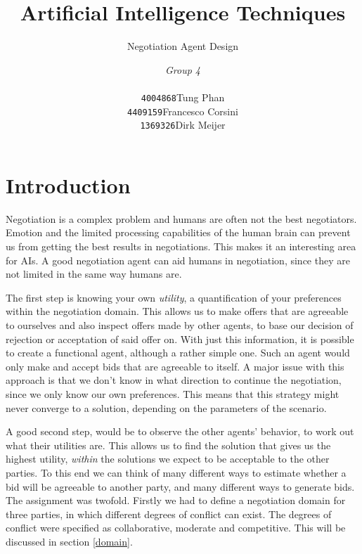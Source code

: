 \documentclass[a4,11pt]{scrartcl}
\title{Artificial Intelligence Techniques}
\subtitle{Negotiation Agent Design}
\author{\emph{Group 4}\\
\begin{tabular}{ll}
\texttt{4004868}&Tung Phan\\
\texttt{4409159}&Francesco Corsini\\
\texttt{1369326}&Dirk Meijer
\end{tabular}}
\begin{document}
\maketitle

\null\vfill
\tableofcontents
\pagebreak

\section{Introduction}

    Negotiation is a complex problem and humans are often not the best 
    negotiators. Emotion and the limited processing capabilities of the 
    human brain can prevent us from getting the best results in 
    negotiations. This makes it an interesting area for AIs. A good 
    negotiation agent can aid humans in negotiation, since they are not 
    limited in the same way humans are.

    The first step is knowing your own \emph{utility}, a quantification 
    of your preferences within the negotiation domain. This allows us 
    to make offers that are agreeable to ourselves and also inspect 
    offers made by other agents, to base our decision of rejection or 
    acceptation of said offer on. With just this information, it is 
    possible to create a functional agent, although a rather simple 
    one. Such an agent would only make and accept bids that are 
    agreeable to itself. A major issue with this approach is that we 
    don't know in what direction to continue the negotiation, since we 
    only know our own preferences. This means that this strategy might 
    never converge to a solution, depending on the parameters of the 
    scenario.

    A good second step, would be to observe the other agents' behavior, 
    to work out what their utilities are. This allows us to find the 
    solution that gives us the highest utility, \emph{within} the 
    solutions we expect to be acceptable to the other parties. To this 
    end we can think of many different ways to estimate whether a bid 
    will be agreeable to another party, and many different ways to 
    generate bids. \\

    \noindent The assignment was twofold. Firstly we had to define a 
    negotiation domain for three parties, in which different degrees of 
    conflict can exist. The degrees of conflict were specified as 
    collaborative, moderate and competitive. This will be discussed in 
    section \ref{domain}.
\end{document}
